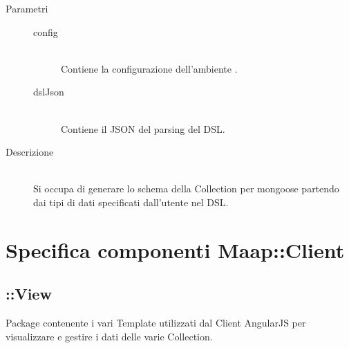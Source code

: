 \begin{description}
\begin{mldescription}
  \hfill
 \begin{description}
      		\item[Parametri] \hfill
      			\begin{description}
      				\item[config] \hfill \\
      				Contiene la configurazione dell'ambiente .
      				\item[dslJson] \hfill \\
      				Contiene il JSON del parsing del DSL.
      			\end{description}
      		\item[Descrizione] \hfill \\
      		Si occupa di generare lo schema della Collection per mongoose partendo dai tipi di dati specificati dall'utente nel DSL.
      		
      		
      		
    \end{description}
 \end{mldescription}
 
\end{description}
\section{Specifica componenti Maap::Client}

\subsection{::View}
Package contenente i vari Template utilizzati dal Client AngularJS per visualizzare e gestire i dati delle varie Collection.


